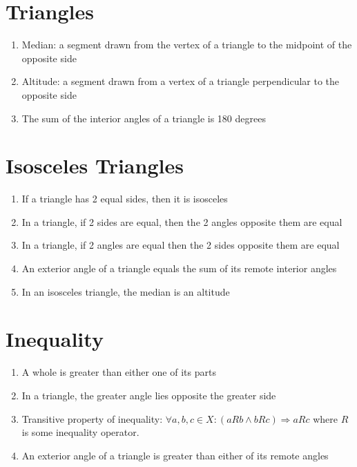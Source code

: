 \section*{Triangles}
\begin{enumerate}
    \item Median: a segment drawn from the vertex of a triangle to the midpoint of the opposite side
    \item Altitude: a segment drawn from a vertex of a triangle perpendicular to the opposite side
    \item The sum of the interior angles of a triangle is 180 degrees
\end{enumerate}

\section*{Isosceles Triangles}
\begin{enumerate}
    \item If a triangle has 2 equal sides, then it is isosceles
    \item In a triangle, if 2 sides are equal, then the 2 angles opposite them are equal
    \item In a triangle, if 2 angles are equal then the 2 sides opposite them are equal
    \item An exterior angle of a triangle equals the sum of its remote interior angles
    \item In an isosceles triangle, the median is an altitude
\end{enumerate}
\section*{Inequality}
\begin{enumerate}
    \item A whole is greater than either one of its parts
    \item In a triangle, the greater angle lies opposite the greater side
    \item Transitive property of inequality: $\forall a,b,c\in X:(aRb\wedge bRc)\Rightarrow aRc$ where $R$ is some inequality operator.
    \item An exterior angle of a triangle is greater than either of its remote angles
\end{enumerate}

